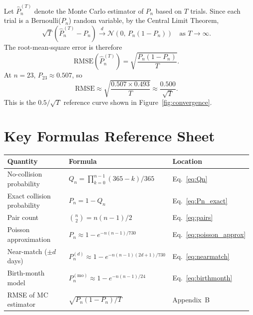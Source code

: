 \documentclass[12pt]{report}
\theoremstyle{definition}
\begin{document}
Let $\hat{P}_n^{(T)}$ denote the Monte Carlo estimator of $P_n$ based on $T$ trials.
Since each trial is a Bernoulli($P_n$) random variable, by the Central Limit Theorem,
\[
  \sqrt{T}\left(\hat{P}_n^{(T)} - P_n\right)
  \xrightarrow{d} \mathcal{N}\!\left(0,\, P_n(1-P_n)\right)
  \quad \text{as } T \to \infty.
\]
The root-mean-square error is therefore
\[
  \mathrm{RMSE}(\hat{P}_n^{(T)}) = \sqrt{\frac{P_n(1-P_n)}{T}}.
\]
At $n=23$, $P_{23} \approx 0.507$, so
\[
  \mathrm{RMSE} \approx \sqrt{\frac{0.507 \times 0.493}{T}} \approx \frac{0.500}{\sqrt{T}}.
\]
This is the $0.5/\sqrt{T}$ reference curve shown in Figure~\ref{fig:convergence}.

\chapter{Key Formulas Reference Sheet}

\begin{center}
\renewcommand{\arraystretch}{1.6}
\begin{tabular}{@{}lll@{}}
  \toprule
  Quantity & Formula & Location \\
  \midrule
  No-collision probability & $Q_n = \prod_{k=0}^{n-1}(365-k)/365$ & Eq.~\eqref{eq:Qn} \\
  Exact collision probability & $P_n = 1 - Q_n$ & Eq.~\eqref{eq:Pn_exact} \\
  Pair count & $\binom{n}{2} = n(n-1)/2$ & Eq.~\eqref{eq:pairs} \\
  Poisson approximation & $P_n \approx 1 - e^{-n(n-1)/730}$ & Eq.~\eqref{eq:poisson_approx} \\
  Near-match ($\pm d$ days) & $P_n^{(d)} \approx 1 - e^{-n(n-1)(2d+1)/730}$ & Eq.~\eqref{eq:nearmatch} \\
  Birth-month model & $P_n^{(\text{mo})} \approx 1 - e^{-n(n-1)/24}$ & Eq.~\eqref{eq:birthmonth} \\
  RMSE of MC estimator & $\sqrt{P_n(1-P_n)/T}$ & Appendix~B \\
  \bottomrule
\end{tabular}
\end{center}
\end{document}
